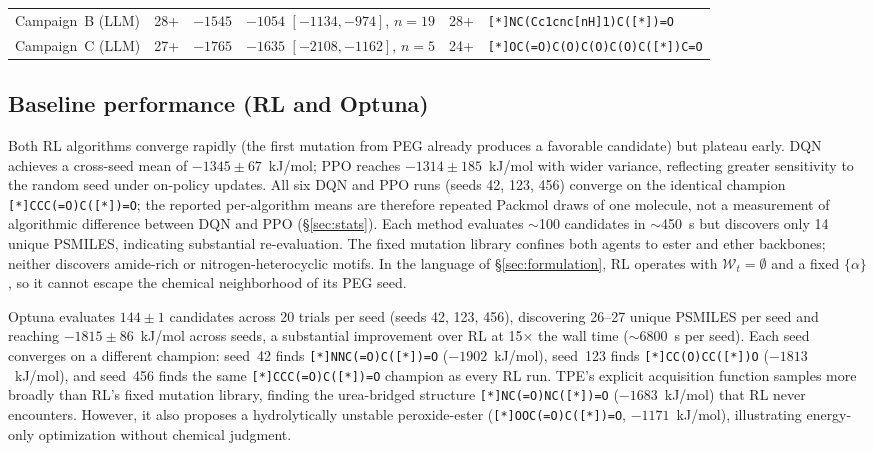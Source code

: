 \documentclass[twocolumn]{fairmeta}
\begin{document}
\begin{table}[t]
\begin{tabular}{lccccl}
Campaign~B (LLM)   & 28+        & $-1545$          & $-1054$ $[-1134,-974]$, $n{=}19$\footnotemark[1] & 28+ & \texttt{[*]NC(Cc1cnc[nH]1)C([*])=O} \\
Campaign~C (LLM)   & 27+        & $-1765$          & $-1635$ $[-2108,-1162]$, $n{=}5$\footnotemark[2] & 24+ & \texttt{[*]OC(=O)C(O)C(O)C(O)C([*])C=O} \\
\bottomrule
\end{tabular}
\end{table}

\subsection{Baseline performance (RL and Optuna)}
\label{sec:baselines}

Both RL algorithms converge rapidly (the first mutation from PEG already produces a favorable candidate) but plateau early.
DQN achieves a cross-seed mean of $-1345 \pm 67$~kJ/mol; PPO reaches $-1314 \pm 185$~kJ/mol with wider variance, reflecting greater sensitivity to the random seed under on-policy updates.
All six DQN and PPO runs (seeds 42, 123, 456) converge on the identical champion \texttt{[*]CCC(=O)C([*])=O}; the reported per-algorithm means are therefore repeated Packmol draws of one molecule, not a measurement of algorithmic difference between DQN and PPO (\S\ref{sec:stats}).
Each method evaluates ${\sim}$100 candidates in ${\sim}$450~s but discovers only 14 unique PSMILES, indicating substantial re-evaluation.
The fixed mutation library confines both agents to ester and ether backbones; neither discovers amide-rich or nitrogen-heterocyclic motifs.
In the language of \S\ref{sec:formulation}, RL operates with $\mathcal{W}_t = \emptyset$ and a fixed $\{\alpha\}$, so it cannot escape the chemical neighborhood of its PEG seed.

Optuna evaluates $144\pm1$ candidates across 20 trials per seed (seeds 42, 123, 456), discovering 26--27 unique PSMILES per seed and reaching $-1815 \pm 86$~kJ/mol across seeds, a substantial improvement over RL at 15$\times$ the wall time (${\sim}$6800~s per seed).
Each seed converges on a different champion: seed~42 finds \texttt{[*]NNC(=O)C([*])=O} ($-1902$~kJ/mol), seed~123 finds \texttt{[*]CC(O)CC([*])O} ($-1813$~kJ/mol), and seed~456 finds the same \texttt{[*]CCC(=O)C([*])=O} champion as every RL run.
TPE's explicit acquisition function samples more broadly than RL's fixed mutation library, finding the urea-bridged structure \texttt{[*]NC(=O)NC([*])=O} ($-1683$~kJ/mol) that RL never encounters.
However, it also proposes a hydrolytically unstable peroxide-ester (\texttt{[*]OOC(=O)C([*])=O}, $-1171$~kJ/mol), illustrating energy-only optimization without chemical judgment.
\end{document}
